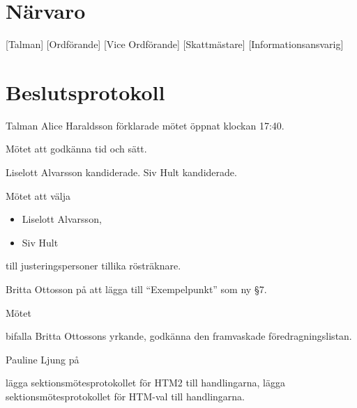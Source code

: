 \documentclass{dsekminutes}
\begin{document}
\maketitle

\section*{Närvaro}
\begin{attendance}
  [Talman]
  [Ordförande]
  [Vice Ordförande]
  [Skattmästare]
  [Informationsansvarig]
\end{attendance}

\section*{Beslutsprotokoll}

Talman Alice Haraldsson förklarade mötet öppnat klockan 17:40.

Mötet  att godkänna tid och sätt.

Liselott Alvarsson kandiderade.  Siv Hult kandiderade.

Mötet  att välja
\begin{itemize}
\item Liselott Alvarsson,
\item Siv Hult
\end{itemize}
till justeringspersoner tillika rösträknare.

Britta Ottosson \yrkade på att lägga till ``Exempelpunkt''
som ny §7.

Mötet 
\begin{attlist}
  \att bifalla Britta Ottossons yrkande,
  \att godkänna den framvaskade föredragningslistan.
\end{attlist}

Pauline Ljung \yrkade på
\begin{attlist}
  \att lägga sektionsmötesprotokollet för HTM2 till handlingarna,
  \att lägga sektionsmötesprotokollet för HTM-val till handlingarna.
\end{attlist}
\end{document}
